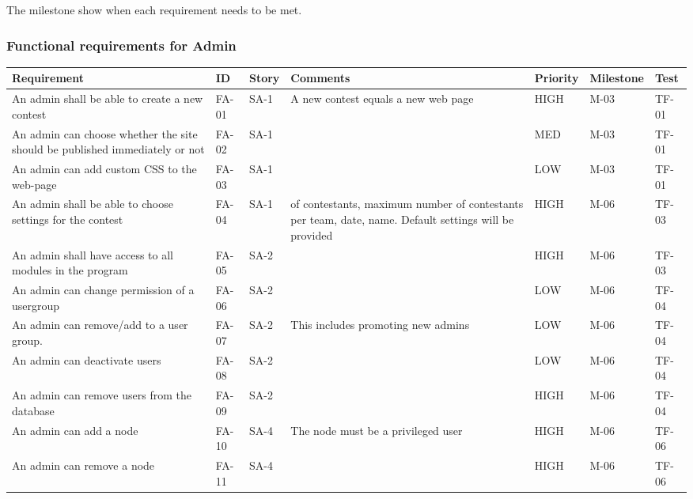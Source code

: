 The milestone show when each requirement needs to be met.

\subsubsection{Functional requirements for Admin}
\begin{supertabular}{|p{2cm}|l|m{0.33795986in}|m{1.2684599in}|m{0.5254598in}|m{1.0983598in}|m{1.0566599in}|}
\hline
Requirement & ID & Story & Comments & Priority & Milestone & Test \\
\hline
An admin shall be able to create a new contest & FA-01 & SA-1 & A new contest
equals a new web page & HIGH & M-03 &
TF-01\\
\hline

An admin can choose whether the site should be published immediately or not &
FA-02 & SA-1 & & MED & M-03 & TF-01\\
\hline

An admin can add custom CSS to the web-page & FA-03 & SA-1 & & LOW & M-03 & TF-01\\
\hline

An admin shall be able to choose settings for the contest & FA-04 & SA-1 & of
contestants, maximum number of contestants per team, date, name.  Default
settings will be provided & HIGH & M-06 & TF-03\\
\hline

An admin shall have access to all modules in the program & FA-05 & SA-2 & &
HIGH & M-06 & TF-03\\ 
\hline

An admin can change permission of a usergroup & FA-06 & SA-2 & & LOW & M-06 &
TF-04\\ 
\hline

An admin can remove/add to a user group. & FA-07 & SA-2 & This
includes promoting new admins & LOW & M-06 & TF-04\\ 
\hline 

An admin can deactivate users & FA-08 & SA-2 & & LOW & M-06 & TF-04\\ 
\hline

An admin can remove users from the database & FA-09 & SA-2 && HIGH & M-06 & TF-04\\ 
\hline

An admin can add a node & FA-10 & SA-4 & The node must be a privileged
user & HIGH & M-06 & TF-06\\ 
\hline 

An admin can remove a node & FA-11 & SA-4 & & HIGH & M-06 & TF-06\\ 
\hline 


\end{supertabular}
